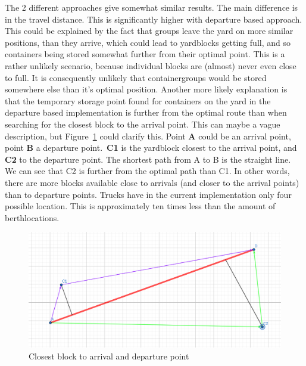 \documentclass[]{article}
\begin{document}
The 2 different approaches give somewhat similar results. The main difference
is in the travel distance. This is significantly higher with departure based
approach. This could be explained by the fact that groups leave the yard on
more similar positions, than they arrive, which could lead to yardblocks
getting full, and so containers being stored somewhat further from their
optimal point. This is a rather unlikely scenario, because individual blocks
are (almost) never even close to full. It is consequently unlikely that
containergroups would be stored somewhere else than it's optimal position.
Another more likely explanation is that the temporary storage point found for
containers on the yard in the departure based implementation is further from
the optimal route than when searching for the closest block to the arrival
point. This can maybe a vague description, but Figure~\ref{fig:closest} could
clarify this. Point \textbf{A} could be an arrival point, point \textbf{B} a
departure point.~\textbf{C1} is the yardblock closest to the arrival point, and
\textbf{C2} to the departure point. The shortest path from A to B is the
straight line. We can see that C2 is further from the optimal path than C1. In
other words, there are more blocks available close to arrivals (and closer to
the arrival points) than to departure points. Trucks have in the current
implementation only four possible location. This is approximately ten times
less than the amount of berthlocations.
\begin{figure}
	\centering
	\includegraphics[width=0.7\linewidth]{Afbeeldingen/distances.png}
	\caption{Closest block to arrival and departure point}\label{fig:closest}
\end{figure}
\end{document}
